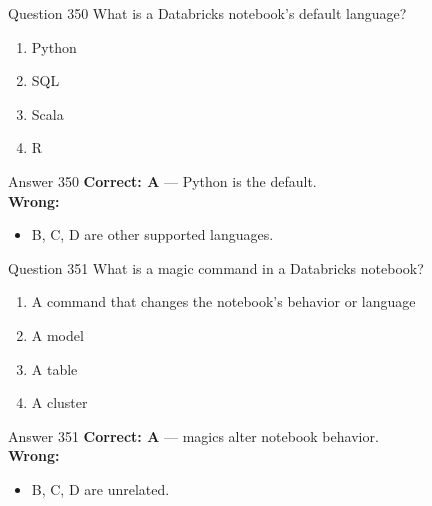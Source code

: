 \documentclass[aspectratio=169,11pt]{beamer}
\begin{document}
	\begin{frame}{Question 350}
		What is a Databricks notebook's default language?
		\begin{enumerate}[label=\Alph*.]
			\item Python
			\item SQL
			\item Scala
			\item R
		\end{enumerate}
	\end{frame}
	\begin{frame}{Answer 350}
		\textbf{Correct: A} --- Python is the default.\\
		\vspace{0.5em}
		\textbf{Wrong:}
		\begin{itemize}
			\item B, C, D are other supported languages.
		\end{itemize}
	\end{frame}
	
	\begin{frame}{Question 351}
		What is a magic command in a Databricks notebook?
		\begin{enumerate}[label=\Alph*.]
			\item A command that changes the notebook's behavior or language
			\item A model
			\item A table
			\item A cluster
		\end{enumerate}
	\end{frame}
	\begin{frame}{Answer 351}
		\textbf{Correct: A} --- magics alter notebook behavior.\\
		\vspace{0.5em}
		\textbf{Wrong:}
		\begin{itemize}
			\item B, C, D are unrelated.
		\end{itemize}
	\end{frame}
	
\end{document}
